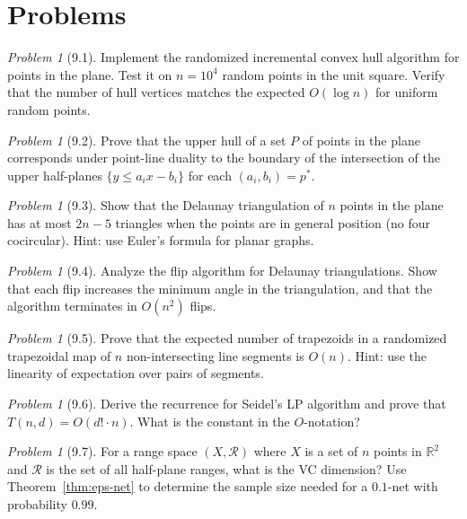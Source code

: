 \documentclass[twoside,12pt]{book}
\theoremstyle{plain}
\theoremstyle{definition}
\theoremstyle{remark}
\newtheorem{problem}[theorem]{Problem}
\begin{document}
\section*{Problems}
\label{sec:problems-9}

\begin{problem}[9.1]
Implement the randomized incremental convex hull algorithm for points in the plane. Test it on $n = 10^4$ random points in the unit square. Verify that the number of hull vertices matches the expected $O(\log n)$ for uniform random points.
\end{problem}

\begin{problem}[9.2]
Prove that the upper hull of a set $P$ of points in the plane corresponds under point-line duality to the boundary of the intersection of the upper half-planes $\{y \leq a_i x - b_i\}$ for each $(a_i, b_i) = p^*$.
\end{problem}

\begin{problem}[9.3]
Show that the Delaunay triangulation of $n$ points in the plane has at most $2n - 5$ triangles when the points are in general position (no four cocircular). Hint: use Euler's formula for planar graphs.
\end{problem}

\begin{problem}[9.4]
Analyze the flip algorithm for Delaunay triangulations. Show that each flip increases the minimum angle in the triangulation, and that the algorithm terminates in $O(n^2)$ flips.
\end{problem}

\begin{problem}[9.5]
Prove that the expected number of trapezoids in a randomized trapezoidal map of $n$ non-intersecting line segments is $O(n)$. Hint: use the linearity of expectation over pairs of segments.
\end{problem}

\begin{problem}[9.6]
Derive the recurrence for Seidel's LP algorithm and prove that $T(n, d) = O(d! \cdot n)$. What is the constant in the $O$-notation?
\end{problem}

\begin{problem}[9.7]
For a range space $(X, \mathcal{R})$ where $X$ is a set of $n$ points in $\mathbb{R}^2$ and $\mathcal{R}$ is the set of all half-plane ranges, what is the VC dimension? Use Theorem~\ref{thm:eps-net} to determine the sample size needed for a $0.1$-net with probability $0.99$.
\end{problem}
\end{document}

